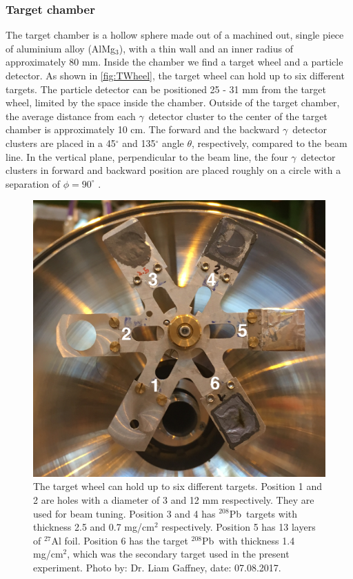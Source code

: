 \documentclass[twoside,english]{uiofysmaster/uiofysmaster}
\newcommand{\Pb}{$^{208}$Pb}
\newcommand{\ga}{$\gamma$}
\let\orgautoref\autoref
\renewcommand{\autoref}
        {%
		 \def\sectionautorefname{Section}%
		 \def\subsectionautorefname{Section}%
		 \def\subsubsectionautorefname{Section}%
		 \def\chapterautorefname{Chapter}%
          \orgautoref}
\begin{document}
\subsubsection{Target chamber}
The target chamber is a hollow sphere made out of a machined out, single piece of aluminium alloy (AlMg$_3$), with a thin wall and an inner radius of approximately 80 mm. 
Inside the chamber we find a target wheel and a particle detector. 
As shown in \autoref{fig:TWheel}, the target wheel can hold up to six different targets. 
The particle detector can be positioned 25 - 31 mm from the target wheel, limited by the space inside the chamber. 
Outside of the target chamber, the average distance from each \ga\ detector cluster to the center of the target chamber is approximately 10 cm.
The forward and the backward \ga\ detector clusters are placed in a 45$^\circ$ and 135$^\circ$ angle $\theta$, respectively, compared to the beam line.
In the vertical plane, perpendicular to the beam line, the four \ga\ detector clusters in forward and backward position are placed roughly on a circle with a separation of $\phi = 90^\circ$ \cite{MB-spect}.  

\begin{figure}[ht]
	\centering
	\includegraphics[width=0.8\linewidth]{Images/Target-wheel.png}
	\caption{The target wheel can hold up to six different targets. Position 1 and 2 are holes with a diameter of 3 and 12 mm respectively. They are used for beam tuning. Position 3 and 4 has \Pb\ targets with thickness 2.5 and 0.7 mg/cm$^2$ respectively. Position 5 has 13 layers of $^{27}$Al foil. Position 6 has the target \Pb\ with thickness 1.4 mg/cm$^2$, which was the secondary target used in the present experiment. Photo by: Dr. Liam Gaffney, date: 07.08.2017.}
	\label{fig:TWheel}
\end{figure}
\end{document}

